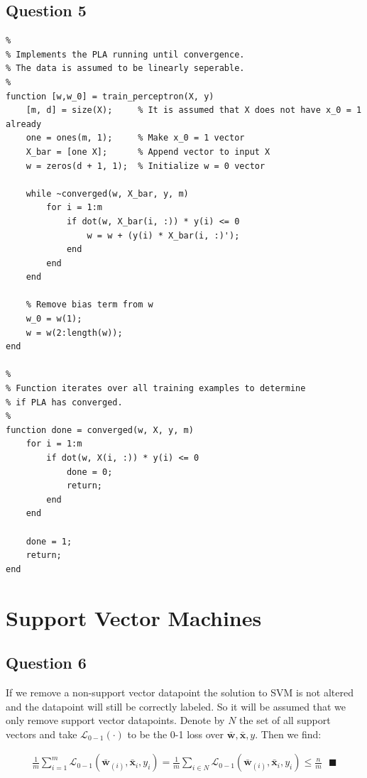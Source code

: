 \documentclass[11pt, oneside]{article}   	%
\begin{document}
\subsection{Question 5}
\begin{verbatim}
%
% Implements the PLA running until convergence.
% The data is assumed to be linearly seperable.
%
function [w,w_0] = train_perceptron(X, y)
    [m, d] = size(X);     % It is assumed that X does not have x_0 = 1 already
    one = ones(m, 1);     % Make x_0 = 1 vector
    X_bar = [one X];      % Append vector to input X
    w = zeros(d + 1, 1);  % Initialize w = 0 vector
    
    while ~converged(w, X_bar, y, m)
        for i = 1:m
            if dot(w, X_bar(i, :)) * y(i) <= 0
                w = w + (y(i) * X_bar(i, :)');    
            end
        end
    end
    
    % Remove bias term from w
    w_0 = w(1);
    w = w(2:length(w));
end

%
% Function iterates over all training examples to determine
% if PLA has converged.
%
function done = converged(w, X, y, m)
    for i = 1:m
        if dot(w, X(i, :)) * y(i) <= 0
            done = 0;
            return;
        end
    end
    
    done = 1;
    return;
end\end{verbatim}

\section{Support Vector Machines}
\subsection{Question 6}
If we remove a non-support vector datapoint the solution to SVM is not altered and the datapoint will still be correctly labeled.  So it will be assumed that we only remove support vector datapoints.  Denote by $N$ the set of all support vectors and take $\mathcal{L}_{0-1}(\cdot)$ to be the 0-1 loss over $\boldsymbol{\bar{w}}, \boldsymbol{\bar{x}}, y$.  Then we find:

\begin{gather*}
\frac{1}{m} \sum_{i = 1}^{m}\mathcal{L}_{0-1}(\boldsymbol{\bar{w}}_{(i)}, \boldsymbol{\bar{x}}_i, y_i) = \frac{1}{m} \sum_{i \in N}\mathcal{L}_{0-1}(\boldsymbol{\bar{w}}_{(i)}, \boldsymbol{\bar{x}}_i, y_i) \leq \frac{n}{m} \text{ } \blacksquare
\end{gather*}
\end{document}
